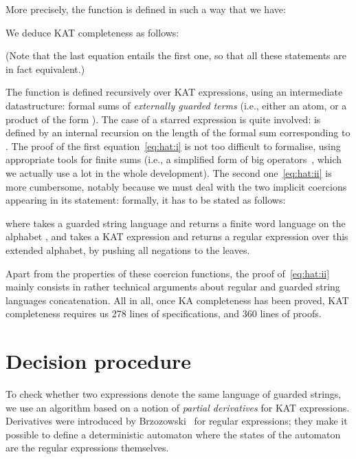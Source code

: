 \documentclass[a4paper]{llncs}
\newif\iflong\longfalse
\begin{document}
More precisely, the function  is defined in such a way
that we have:

We deduce KAT completeness as follows:

(Note that the last equation entails the first one, so that all these
statements are in fact equivalent.)

\medskip

The function  is defined recursively over KAT expressions,
using an intermediate datastructure: formal sums of \emph{externally
  guarded terms} (i.e., either an atom, or a product of the form
). The case of a starred expression  is quite
involved:  is defined by an internal recursion on the
length of the formal sum corresponding to .
The proof of the first equation~\eqref{eq:hat:i} is not too difficult
to formalise, using appropriate tools for finite sums (i.e., a
simplified form of big operators~\cite{BertotGBP08}, which we actually
use a lot in the whole development). The second one~\eqref{eq:hat:ii}
is more cumbersome, notably because we must deal with the two implicit
coercions appearing in its statement: formally, it has to be stated as
follows:

where  takes a guarded string language and returns a finite word
language on the alphabet , and 
takes a KAT expression and returns a regular expression over this
extended alphabet, by pushing all negations to the leaves.

\iflong
The function  is defined by pushing all negations to the leaves
using de Morgan laws, and interpreting conjunction, disjunction, top
element, and bottom element as product, sums, unit, and zero,
respectively.
The function  is harder to describe succinctly; on an example,
assuming that  has three elements, if 
and , the guarded string 
is interpreted as the word
 (where 
denotes a letter in the first copy of  while  denotes
the same element in the second copy).
\fi

Apart from the properties of these coercion functions, the proof
of~\eqref{eq:hat:ii} mainly consists in rather technical arguments
about regular and guarded string languages concatenation.
All in all, once KA completeness has been proved, KAT completeness
requires us 278 lines of specifications, and 360 lines of proofs.

\section{Decision procedure}
\label{sec:decision}

To check whether two expressions denote the same language of guarded
strings, we use an algorithm based on a notion of \emph{partial
  derivatives} for KAT expressions.
Derivatives were introduced by Brzozowski~\cite{Brzozowski64} for
regular expressions; they make it possible to define a deterministic
automaton where the states of the automaton are the regular
expressions themselves. 
\end{document}
